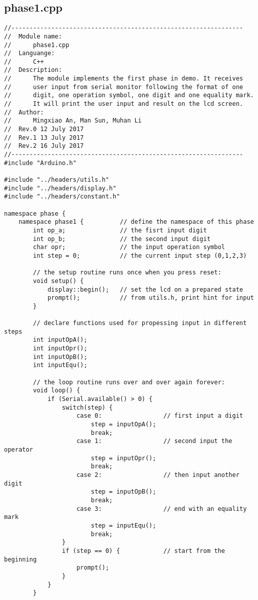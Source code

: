 \subsection{phase1.cpp}
\begin{verbatim}
//----------------------------------------------------------------
//  Module name:
//      phase1.cpp
//  Languange:
//      C++
//  Description:
//      The module implements the first phase in demo. It receives 
//      user input from serial monitor following the format of one 
//      digit, one operation symbol, one digit and one equality mark.
//      It will print the user input and result on the lcd screen.
//  Author:
//      Mingxiao An, Man Sun, Muhan Li
//  Rev.0 12 July 2017
//  Rev.1 13 July 2017
//  Rev.2 16 July 2017
//----------------------------------------------------------------
#include "Arduino.h"

#include "../headers/utils.h"
#include "../headers/display.h"
#include "../headers/constant.h"

namespace phase {           
    namespace phase1 {          // define the namespace of this phase
        int op_a;               // the fisrt input digit
        int op_b;               // the second input digit
        char opr;               // the input operation symbol
        int step = 0;           // the current input step (0,1,2,3)
 
        // the setup routine runs once when you press reset:
        void setup() {
            display::begin();   // set the lcd on a prepared state
            prompt();           // from utils.h, print hint for input
        }

        // declare functions used for propessing input in different steps
        int inputOpA();         
        int inputOpr();
        int inputOpB();
        int inputEqu();

        // the loop routine runs over and over again forever:
        void loop() {
            if (Serial.available() > 0) {
                switch(step) {
                    case 0:                 // first input a digit
                        step = inputOpA(); 
                        break;
                    case 1:                 // second input the operator
                        step = inputOpr(); 
                        break;
                    case 2:                 // then input another digit
                        step = inputOpB(); 
                        break;
                    case 3:                 // end with an equality mark
                        step = inputEqu(); 
                        break;              
                }
                if (step == 0) {            // start from the beginning
                    prompt();       
                }
            }
        }


\end{verbatim}
